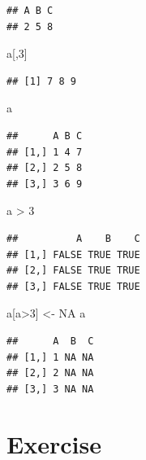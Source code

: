 \documentclass[]{book}
\newenvironment{Shaded}{\begin{snugshade}}{\end{snugshade}}
\newcommand{\DecValTok}[1]{\textcolor[rgb]{0.00,0.00,0.81}{{#1}}}
\newcommand{\StringTok}[1]{\textcolor[rgb]{0.31,0.60,0.02}{{#1}}}
\newcommand{\OtherTok}[1]{\textcolor[rgb]{0.56,0.35,0.01}{{#1}}}
\newcommand{\NormalTok}[1]{{#1}}
\begin{document}
\begin{verbatim}
## A B C 
## 2 5 8
\end{verbatim}

\begin{Shaded}
\begin{Highlighting}[]
\NormalTok{a[,}\DecValTok{3}\NormalTok{]}
\end{Highlighting}
\end{Shaded}

\begin{verbatim}
## [1] 7 8 9
\end{verbatim}

\begin{Shaded}
\begin{Highlighting}[]
\NormalTok{a}
\end{Highlighting}
\end{Shaded}

\begin{verbatim}
##      A B C
## [1,] 1 4 7
## [2,] 2 5 8
## [3,] 3 6 9
\end{verbatim}

\begin{Shaded}
\begin{Highlighting}[]
\NormalTok{a >}\StringTok{ }\DecValTok{3}
\end{Highlighting}
\end{Shaded}

\begin{verbatim}
##          A    B    C
## [1,] FALSE TRUE TRUE
## [2,] FALSE TRUE TRUE
## [3,] FALSE TRUE TRUE
\end{verbatim}

\begin{Shaded}
\begin{Highlighting}[]
\NormalTok{a[a>}\DecValTok{3}\NormalTok{] <-}\StringTok{ }\OtherTok{NA}
\NormalTok{a}
\end{Highlighting}
\end{Shaded}

\begin{verbatim}
##      A  B  C
## [1,] 1 NA NA
## [2,] 2 NA NA
## [3,] 3 NA NA
\end{verbatim}

\section{Exercise}\label{exercise-4}
\end{document}
